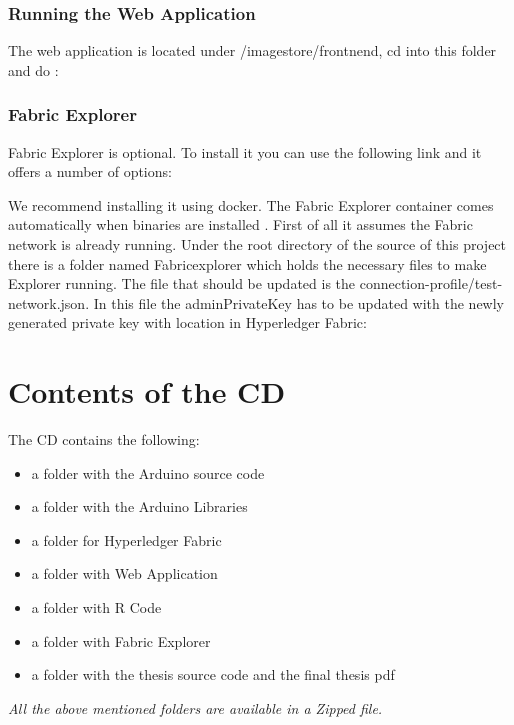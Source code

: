 \subsection{Running the Web Application}

The web application is located under {\selectfont /imagestore/frontnend}, cd into this folder and do : 

\subsection{Fabric Explorer}
Fabric Explorer is optional. To install it you can use the following link and it offers a number of options: 


We recommend installing it using docker. The Fabric Explorer container comes automatically when binaries are installed . First of all it assumes the Fabric network is already running. Under the root directory of the source of this project there is a folder named {\selectfont Fabricexplorer} which holds the necessary files to make Explorer running. The file that should be updated is the {\selectfont connection-profile/test-network.json}. In this file the {\selectfont adminPrivateKey} has to be updated with the newly generated private key with location in Hyperledger Fabric: 






\chapter{Contents of the CD}
The CD contains the following:

\begin{itemize}
    \item a folder with the Arduino source code
    \item a folder with the Arduino Libraries
    \item a folder for Hyperledger Fabric
    \item a folder with Web Application
    \item a folder with R Code
    \item a folder with Fabric Explorer
    \item a folder with the thesis source code and the final thesis pdf
 
\end{itemize}

\emph{All the above mentioned folders are available in a Zipped file.}




%

